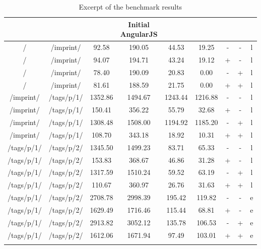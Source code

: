 {{\begin{center}
\footnotesize
\begin{longtable}{ccccccccc}
    \caption{Excerpt of the \selenium{} benchmark results}
    \\
	\hline
	\thead{From} & \thead{To} & \thead{Common} & \thead{Initial\\AngularJS} & \thead{\lare{}} & \thead{AngularJS} &  \thead{DC} & \thead{TC} & \thead{} \\
\hline
/ & /imprint/ & 92.58 & 190.05 & 44.53 & 19.25 & - & - & l \\
/ & /imprint/ & 94.07 & 194.71 & 43.24 & 19.12 & + & - & l \\
/ & /imprint/ & 78.40 & 190.09 & 20.83 & 0.00 & - & + & l \\
/ & /imprint/ & 81.61 & 188.59 & 21.75 & 0.00 & + & + & l \\
\hline
/imprint/ & /tags/p/1/ & 1352.86 & 1494.67 & 1243.44 & 1216.88 & - & - & l \\
/imprint/ & /tags/p/1/ & 150.41 & 356.22 & 55.79 & 32.68 & + & - & l \\
/imprint/ & /tags/p/1/ & 1308.48 & 1508.00 & 1194.92 & 1185.20 & - & + & l \\
/imprint/ & /tags/p/1/ & 108.70 & 343.18 & 18.92 & 10.31 & + & + & l \\
\hline
/tags/p/1/ & /tags/p/2/ & 1345.50 & 1499.23 & 83.71 & 65.33 & - & - & l \\
/tags/p/1/ & /tags/p/2/ & 153.83 & 368.67 & 46.86 & 31.28 & + & - & l \\
/tags/p/1/ & /tags/p/2/ & 1317.59 & 1510.24 & 59.52 & 63.19 & - & + & l \\
/tags/p/1/ & /tags/p/2/ & 110.67 & 360.97 & 26.76 & 31.63 & + & + & l \\
\hline
/tags/p/1/ & /tags/p/2/ & 2708.78 & 2998.39 & 195.42 & 119.82 & - & - & e \\
/tags/p/1/ & /tags/p/2/ & 1629.49 & 1716.46 & 115.44 & 68.81 & + & - & e \\
/tags/p/1/ & /tags/p/2/ & 2913.82 & 3052.12 & 135.78 & 106.53 & - & + & e \\
/tags/p/1/ & /tags/p/2/ & 1612.06 & 1671.94 & 97.49 & 103.01 & + & + & e \\
\hline
\label{tab:short_selenium}
\end{longtable}
\end{center}

}}
